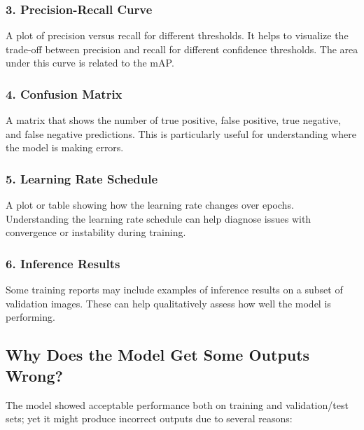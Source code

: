 \documentclass[conference]{IEEEtran}
\begin{document}
\subsubsection*{3. Precision-Recall Curve}
A plot of precision versus recall for different thresholds. It helps to visualize the trade-off between precision and recall for different confidence thresholds. The area under this curve is related to the mAP.

\subsubsection*{4. Confusion Matrix}
A matrix that shows the number of true positive, false positive, true negative, and false negative predictions. This is particularly useful for understanding where the model is making errors.

\subsubsection*{5. Learning Rate Schedule}
A plot or table showing how the learning rate changes over epochs. Understanding the learning rate schedule can help diagnose issues with convergence or instability during training.

\subsubsection*{6. Inference Results}
Some training reports may include examples of inference results on a subset of validation images. These can help qualitatively assess how well the model is performing.

\subsection*{Why Does the Model Get Some Outputs Wrong?}

The model showed acceptable performance both on training and validation/test sets; yet it might produce incorrect outputs due to several reasons:
\end{document}
